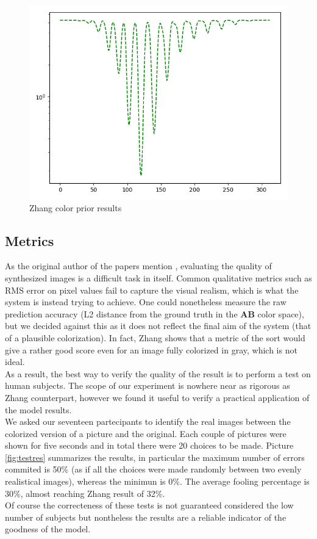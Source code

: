 \documentclass[twoside,twocolumn]{article}
\begin{document}
\begin{figure}[h]
	\includegraphics[width=\linewidth]{img/zhang.png}
	\caption{Zhang \cite{Zhang:2016} color prior results}
	\label{fig:zhangprior}
\end{figure}

\subsection{Metrics}

As the original author of the papers mention \cite{Zhang:2016}, evaluating the quality of synthesized images is a difficult task in itself. Common qualitative metrics such as RMS error on pixel values fail to capture the visual realism, which is what the system is instead trying to achieve.
One could nonetheless measure the raw prediction accuracy (L2 distance from the ground truth in the \textbf{AB} color space), but we decided against this as it does not reflect the final aim of the system (that of a plausible colorization). In fact, Zhang \cite{Zhang:2016} shows that a metric of the sort would give a rather good score even for an image fully colorized in gray, which is not ideal.\\
As a result, the best way to verify the quality of the result is to perform a test on human subjects. The scope of our experiment is nowhere near as rigorous as Zhang counterpart, however we found it useful to verify a practical application of the model results.\\
We asked our seventeen partecipants to identify the real images between the colorized version of a picture and the original. Each couple of pictures were shown for five seconds and in total there were 20 choices to be made.
Picture \ref{fig:testres} summarizes the results, in particular the maximum number of errors commited is 50\% (as if all the choices were made randomly between two evenly realistical images), whereas the minimun is 0\%. The average fooling percentage is 30\%, almost reaching Zhang \cite{Zhang:2016} result of 32\%.\\
Of course the correcteness of these tests is not guaranteed considered the low number of subjects but nontheless the results are a reliable indicator of the goodness of the model.
\end{document}
